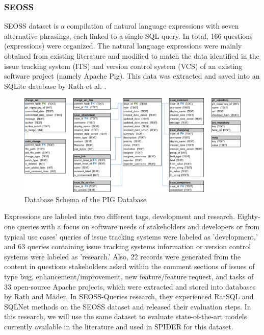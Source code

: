 \subsubsection{SEOSS}

\ac{SEOSS} dataset is a compilation of natural language expressions with seven alternative phrasings, each linked to a single SQL query. In total, 166 questions (expressions) were organized. The natural language expressions were mainly obtained from existing literature and modified to match the data identified in the issue tracking system (ITS) and version control system (VCS) of an existing software project (namely Apache Pig). This data was extracted and saved into an SQLite database by Rath et al. \cite{RATH2019104005}.

\begin{figure}[H]
    \centering
    \includegraphics[width=1\textwidth]{pics/seoss/pig.png}
    \caption{Database Schema of the PIG Database \cite{TOMOVA2022108211}}
    \label{fig:SESS}
\end{figure}

Expressions are labeled into two different tags, development and research. Eighty-one queries with a focus on software needs of stakeholders and developers or from typical use cases' queries of issue tracking systems were labeled as 'development,' and 63 queries containing issue tracking systems information or version control systems were labeled as 'research.' Also, 22 records were generated from the content in questions stakeholders asked within the comment sections of issues of type bug, enhancement/improvement, new feature/feature request, and tasks of 33 open-source Apache projects, which were extracted and stored into databases by Rath and Mäder\cite{RATH2019104005}.
In SEOSS-Queries\cite{TOMOVA2022108211} research, they experienced RatSQL and SQLNet methods on the SEOSS dataset and released their evaluation steps. In this research, we will use the same dataset to evaluate state-of-the-art models currently available in the literature and used in SPIDER for this dataset.


